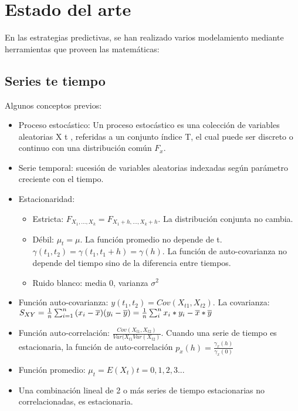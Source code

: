 \section{Estado del arte}

En las estrategias predictivas, se han realizado varios modelamiento mediante herramientas que proveen las matemáticas: \cite{azoff1994neural}
\subsection{Series te tiempo}
Algunos conceptos previos:
\begin{itemize}
	\item Proceso estocástico: Un proceso estocástico es una colección de variables aleatorias { X t } , referidas a un conjunto índice T, el cual puede ser 
		discreto o continuo con una distribución común $F_x$.
	\item Serie temporal: sucesión de variables aleatorias indexadas según parámetro creciente con el tiempo.
	\item Estacionaridad: \cite{brockwell2009time}
	\begin{itemize}
		\item Estricta: $F_{X_1,...,X_k} = F_{X_1+h,...,X_k+h}$. La distribución conjunta no cambia.
		\item Débil: $\mu_t = \mu$. La función promedio no depende de t. $\gamma(t_1,t_2) = \gamma(t_1,t_1+h)=\gamma(h)$. La función de auto-covarianza no depende del tiempo sino de la diferencia entre tiempos.
		\item Ruido blanco: media 0, varianza $\sigma^2$
	\end{itemize}
	\item Función auto-covarianza: $ y(t_1,t_2) = Cov(X_{t1}, X_{t2})$. La covarianza: $S_{XY} = \frac 1n \sum_{i=1}^n { (x_i - \overline{x})(y_i - \overline{y})} = {1 \over n} \sum_{i}^n {x_{i}*y_{i}} - \overline{x} * \overline{y}$
	\item Función auto-correlación: $\frac{Cov(X_{t1},X_{t2})}{Var(X_{t1}Var(X_{t2})}$. Cuando una serie de tiempo es estacionaria, la función de 
		auto-correlación $p_x(h) = \frac{\gamma_x(h)}{\gamma_x(0)}$
	\item Función promedio: $ \mu_{t} = E(X_t) t=0,1,2,3... $
	\item Una combinación lineal de 2 o más series de tiempo estacionarias no correlacionadas, es estacionaria. \cite{hamilton1994time}
\end{itemize}
